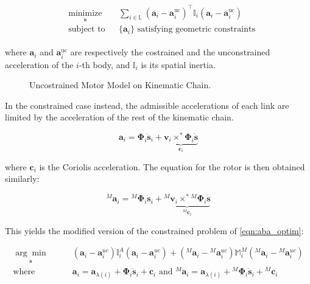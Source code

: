 \begin{align}
    \label{eqn:aba_optim}
    \begin{aligned}
         & \underset{\ddot{\mathbf{s}}}{\text{minimize}}
         &                                               & \sum _{i \in \mathbb{L}} (\mathbf{a}_i - \mathbf{a} _i ^{\text{uc} }) ^\top \mathbb{I} _i(\mathbf{a}_i - \mathbf{a} ^{\text{uc}} _i) \\
         & \text{subject to}
         &                                               & \{\mathbf{a}_i\} \text{ satisfying geometric constraints}
    \end{aligned}
\end{align}

where $\mathbf{a} _i$ and $\mathbf{a} _i ^{\text{uc}}$ are respectively the costrained and the unconstrained acceleration of the $i$-th body, and $\mathbb{I} _i$ is its spatial inertia.


\begin{figure}
    \centering
    \caption{Uncostrained Motor Model on Kinematic Chain.}
    \label{fig:disassembled_motor}
    \resizebox{0.8\textwidth}{!}{
        
    }
\end{figure}

In the constrained case instead, the admissible accelerations of each link are limited by the acceleration of the rest of the kinematic chain.

\begin{equation}
    \mathbf{a} _i = \boldsymbol{\Phi} _i \ddot{\mathbf{s}} _i + \underbrace{\mathbf{v} _i \times ^* \boldsymbol{\Phi} _i \dot{\mathbf{s}}} _{\mathbf{c} _i}
\end{equation}

where $\mathbf{c} _i$ is the Coriolis acceleration. The equation for the rotor is then obtained similarly:

\begin{equation}
    {} ^M \mathbf{a} _i = {} ^M \boldsymbol{\Phi} _i \ddot{\mathbf{s}} _i + \underbrace{{} ^M \mathbf{v} _i \times ^* {} ^M\boldsymbol{\Phi} _i \dot{\mathbf{s}}} _{{} ^M \mathbf{c} _i}
\end{equation}

This yields the modified version of the constrained problem of \cref{eqn:aba_optim}:

\begin{align}
    \underset{\ddot{\mathbf{s}}}{\arg \min} & \qquad (\mathbf{a} _i - \mathbf{a} _i ^{uc}) \mathbb{I} ^A _i (\mathbf{a} _i - \mathbf{a} _i ^{uc}) + ({} ^M \mathbf{a} _i - {} ^M \mathbf{a} _i ^{uc}) \mathbb{M} ^M _i ({} ^M \mathbf{a} _i - {} ^M \mathbf{a} _i ^{uc}) \nonumber                         \\
    \text{where }                           & \qquad \mathbf{a} _i = \mathbf{a} _{\lambda (i)} + \boldsymbol{\Phi} _i \ddot{\mathbf{s}} _i + \mathbf{c} _i \text{ and } {} ^M \mathbf{a} _i = \mathbf{a} _{\lambda (i)} + {} ^M  \boldsymbol{\Phi} _i \ddot{\mathbf{s}} _i + {} ^M \mathbf{c} _i \nonumber \\
\end{align}

